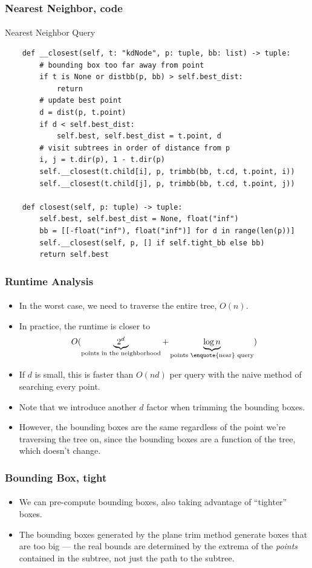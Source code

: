 \documentclass{beamer}                             %
\begin{document}
\begin{frame}[fragile]
\frametitle{Nearest Neighbor, code}
\framesubtitle{}
\begin{algorithm}[H]
  \caption{Nearest Neighbor Query}
  \begin{verbatim}
    def __closest(self, t: "kdNode", p: tuple, bb: list) -> tuple:
        # bounding box too far away from point 
        if t is None or distbb(p, bb) > self.best_dist:
            return
        # update best point
        d = dist(p, t.point)
        if d < self.best_dist:
            self.best, self.best_dist = t.point, d
        # visit subtrees in order of distance from p
        i, j = t.dir(p), 1 - t.dir(p)
        self.__closest(t.child[i], p, trimbb(bb, t.cd, t.point, i))
        self.__closest(t.child[j], p, trimbb(bb, t.cd, t.point, j))

    def closest(self, p: tuple) -> tuple:
        self.best, self.best_dist = None, float("inf")
        bb = [[-float("inf"), float("inf")] for d in range(len(p))]
        self.__closest(self, p, [] if self.tight_bb else bb)
        return self.best
  \end{verbatim}
\end{algorithm}
\end{frame}

\begin{frame}
\frametitle{Runtime Analysis}
\framesubtitle{}
\begin{itemize}
  \item In the worst case, we need to traverse the entire tree, \( O(n) \).
  \item In practice, the runtime is closer to
    \[ O(\underbrace{2^d}_{\text{points in the neighborhood}} + 
      \underbrace{\log n}_{\text{points \enquote{near} query}}) \]
  \item If \( d \) is small, this is faster than \( O(nd) \) per
    query with the naive method of searching every point. \pause
  \item Note that we introduce another \( d \)
    factor when trimming the bounding boxes.
  \item However, the bounding boxes are the same regardless of
    the point we're traversing the tree on, since the bounding
    boxes are a function of the tree, which doesn't change.
\end{itemize}
\end{frame}

\begin{frame}
\frametitle{Bounding Box, tight}
\framesubtitle{}
\begin{itemize}
  \item We can pre-compute bounding boxes, also
    taking advantage of \enquote{tighter} boxes.
  \item The bounding boxes generated by the plane trim method generate boxes
    that are too big --- the real bounds are determined by the extrema of the 
    \textit{points} contained in the subtree, not just the path to the subtree.
\end{itemize}
\end{frame}
\end{document}
